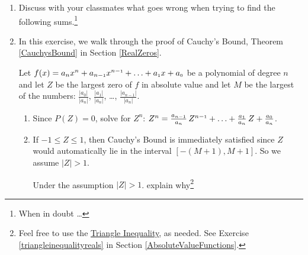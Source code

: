 \begin{enumerate}
\item  Discuss with your classmates what goes wrong when trying to find the following sums.\footnote{When in doubt \ldots }


\begin{enumerate}


\end{enumerate}


\item  \label{CauchyBoundProofExercise}  In this exercise, we walk through the proof of Cauchy's Bound, Theorem \ref{CauchysBound} in Section \ref{RealZeros}.  

\smallskip

Let $f(x) = a_{n} x^{n} + a_{n-\mbox{\tiny$1$}}x^{n-\mbox{\tiny$1$}} + \ldots + a_{\mbox{\tiny$1$}} x + a_{\mbox{\tiny$0$}}$ be a polynomial of degree $n$ and let $Z$ be the largest zero of $f$ in absolute value and let $M$ be the largest of the numbers: $\frac{|a_{0}|}{|a_{n}|}$, $\frac{|a_{1}|}{|a_{n}|}$, \ldots, $\frac{|a_{n-1}|}{|a_{n}|}$.

\begin{enumerate}

\item  Since $P(Z) = 0$, solve for $Z^{n}$:   $Z^{n} = \frac{a_{n-\mbox{\tiny$1$}}}{a_{n}} \, Z^{n-\mbox{\tiny$1$}} + \ldots + \frac{a_{\mbox{\tiny$1$}}}{a_{n}} \,  Z + \frac{a_{\mbox{\tiny$0$}}}{a_{n}}$.

\item  If $-1 \leq Z \leq 1$, then Cauchy's Bound is immediately satisfied since $Z$ would automatically lie in the interval $\left[-(M+1), M+1\right]$. So we assume $|Z|>1$.  

\smallskip

Under the assumption $|Z|>1$. explain why\footnote{Feel free to use the \href{http://en.wikipedia.org/wiki/Triangle_inequality}{\underline{Triangle Inequality}}, as needed.  See Exercise \ref{triangleinequalityreals} in Section \ref{AbsoluteValueFunctions}.} 


\end{enumerate}
\end{enumerate}
